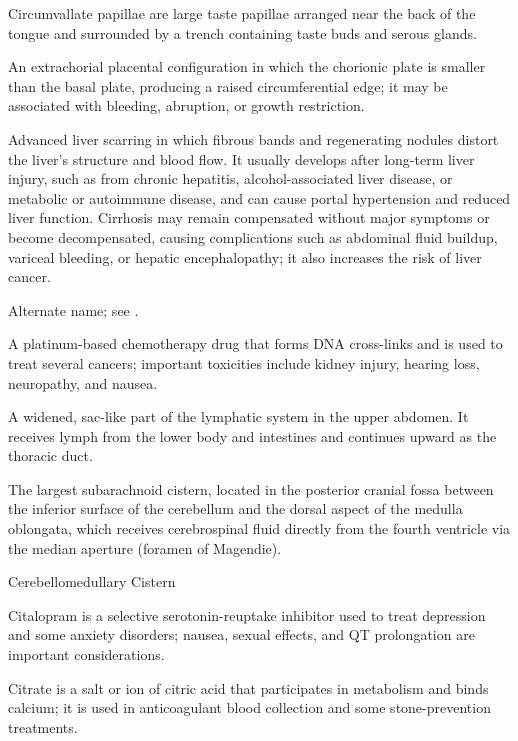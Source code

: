  Circumvallate papillae are large taste papillae arranged near the back of the tongue and surrounded by a trench containing taste buds and serous glands.

 An extrachorial placental configuration in which the chorionic plate is smaller than the basal plate, producing a raised circumferential edge; it may be associated with bleeding, abruption, or growth restriction.

 Advanced liver scarring in which fibrous bands and regenerating nodules distort the liver's structure and blood flow. It usually develops after long-term liver injury, such as from chronic hepatitis, alcohol-associated liver disease, or metabolic or autoimmune disease, and can cause portal hypertension and reduced liver function. Cirrhosis may remain compensated without major symptoms or become decompensated, causing complications such as abdominal fluid buildup, variceal bleeding, or hepatic encephalopathy; it also increases the risk of liver cancer.

 Alternate name; see .

 A platinum-based chemotherapy drug that forms DNA cross-links and is used to treat several cancers; important toxicities include kidney injury, hearing loss, neuropathy, and nausea.

 A widened, sac-like part of the lymphatic system in the upper abdomen. It receives lymph from the lower body and intestines and continues upward as the thoracic duct.

 The largest subarachnoid cistern, located in the posterior cranial fossa between the inferior surface of the cerebellum and the dorsal aspect of the medulla oblongata, which receives cerebrospinal fluid directly from the fourth ventricle via the median aperture (foramen of Magendie).

\synonyms
Cerebellomedullary Cistern

 Citalopram is a selective serotonin-reuptake inhibitor used to treat depression and some anxiety disorders; nausea, sexual effects, and QT prolongation are important considerations.

 Citrate is a salt or ion of citric acid that participates in metabolism and binds calcium; it is used in anticoagulant blood collection and some stone-prevention treatments.

